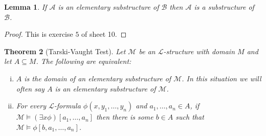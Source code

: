 \documentclass[11pt]{article}
\newtheorem{theorem}{Theorem}[section]
\newtheorem{lemma}[theorem]{Lemma}
\newcommand{\mcal}[1]{\mathcal{#1}}
\begin{document}
\begin{lemma}
If $\mcal{A}$ is an elementary substructure of $\mcal{B}$ then $\mcal{A}$ is a substructure of $\mcal{B}$.
\end{lemma}
\begin{proof}
This is exercise $5$ of sheet 10.
\end{proof}


\begin{theorem}[Tarski-Vaught Test]
Let $\mcal{M}$ be an $\mcal{L}$-structure with domain $M$ and let $A\subseteq M$. The following are equivalent:
\begin{enumerate}[(i)]
\item $A$ is the domain of an elementary substructure of $\mcal{M}$. In this situation we will often say $A$ is an elementary substructure of $\mcal{M}$.
\item For every $\mcal{L}$-formula $\phi(x,y_1,\ldots,y_n)$ and $a_1,\ldots,a_n\in A$, if $\mcal{M}\models (\exists x \phi)[a_1,\ldots,a_n]$ then there is some $b\in A$ such that $\mcal{M}\models \phi[b,a_1,\ldots,a_n]$.
\end{enumerate}
\end{theorem}
\end{document}

